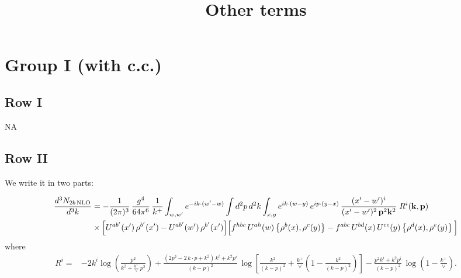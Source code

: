 \documentclass[9pt]{article}
\title{Other terms}
\author{}
\date{}
\numberwithin{equation}{section}
\begin{document}
\maketitle
\section{Group I (with c.c.)}
\subsection{Row I}
\textsc{NA}
\subsection{Row II}
We write it in two parts:

\begin{align}
\frac{d^{3}N_{2b\,\rm NLO}}{d^{3}k} & = -\frac{1}{(2\pi)^{3}}\,\frac{g^{4}}{64\pi^{6}}\,\frac{1}{k^{+}}\int_{w,w'} e^{-ik\cdot(w'-w)}
\int d^{2}p\,d^{2}k\int_{x,y} e^{ik\cdot(w-y)}\,e^{ip\cdot(y-x)}\,\frac{(x'-w')^{i}}{(x'-w')^{2}\,\mathbf{p}^{2}\mathbf{k}^{2}}\;R^{i}(\mathbf{k},\mathbf{p})\notag\\
&\times\Big[U^{ab'}(x')\,\rho^{b'}(x')-U^{ab'}(w')\,\rho^{b'}(x')\Big]
\Big[f^{hbc}\,U^{ah}(w)\left\{\rho^{b}(x),\rho^{c}(y)\right\}-f^{abc}\,U^{bd}(x)\,U^{ce}(y)\left\{\rho^{d}(x),\rho^{e}(y)\right\}\Big]
\end{align}
where
\begin{align}
R^{i} =& -2k^{i}\log\left(\frac{p^{2}}{k^{2}+\frac{k^{+}}{\vee}\,p^{2}}\right)
+\frac{(2p^{2}-2\,k\cdot p+k^{2})\,k^{i}+k^{2}p^{i}}{(k-p)^{2}}\,
\log\left[\frac{k^{2}}{(k-p)^{2}}+\frac{k^{+}}{\vee}\left(1-\frac{k^{2}}{(k-p)^{2}}\right)\right]
-\frac{p^{2}k^{i}+k^{2}p^{i}}{(k-p)^{2}}\,\log\left(1-\frac{k^{+}}{\vee}\right).
\end{align}
\end{document}
